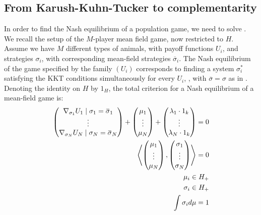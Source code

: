 \subsection{From Karush-Kuhn-Tucker to complementarity}
In order to find the Nash equilibrium of a population game, we need to solve . We recall the setup of the $M$-player mean field game, now restricted to $H$. Assume we have $M$ different types of animals, with payoff functions $U_i$, and strategies $\sigma_i$, with corresponding mean-field strategies $\overbar{\sigma}_i$.
The Nash equilibrium of the game specified by the family $(U_i)$ corresponds to finding a system $\sigma_i^*$ satisfying the KKT conditions simultaneously for every $U_i$, \citep{deimling2010nonlinear}, with $\overbar{\sigma}=\sigma$ as in . Denoting the identity on $H$ by $1_H$, the total criterion for a Nash equilibrium of a mean-field game  is:
\begin{equation}
      \label{eq:KKT_total}
  \begin{split}
  \begin{pmatrix}
    \nabla_{\sigma_1} U_1 \mid{\sigma_1 = \overbar{\sigma}_1} \\
    \vdots \\
    \nabla_{\sigma_N} U_N \mid{\sigma_N = \overbar{\sigma}_N}
\end{pmatrix} + \begin{pmatrix}
    \mu_1 \\
    \vdots \\
    \mu_N
\end{pmatrix} + \begin{pmatrix}
    \lambda_1 \cdot 1_k \\
    \vdots \\
    \lambda_N \cdot 1_k
\end{pmatrix} = 0 \\
\ip{
\begin{pmatrix}
  \mu_1 \\
  \vdots \\
  \mu_N
\end{pmatrix}}{ \begin{pmatrix}
  \sigma_1 \\
  \vdots \\
  \sigma_N
\end{pmatrix}} = 0 \\
\mu_i \in H_+ \\
  \sigma_i \in H_+ \\
  \int \sigma_i d\mu = 1
  \end{split}
\end{equation}
